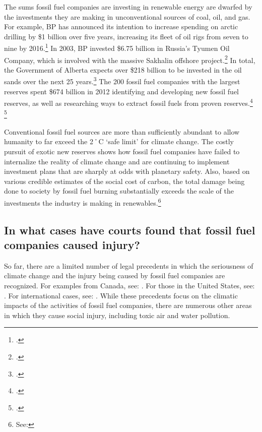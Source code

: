 \documentclass[10pt]{article}
\begin{document}
The sums fossil fuel companies are investing in renewable energy are dwarfed by the investments they are making in unconventional sources of coal, oil, and gas.
For example, BP has announced its intention to increase spending on arctic drilling by \$1 billion over five years, increasing its fleet of oil rigs from seven to nine by 2016.\footcite[][]{BPArcticBillion}
In 2003, BP invested \$6.75 billion in Russia's Tyumen Oil Company, which is involved with the massive Sakhalin offshore project.\footcite[][]{NotBeyondInRussia}
In total, the Government of Alberta expects over \$218 billion to be invested in the oil sands over the next 25 years.\footcite[][]{OilSandsEconBenef}
The 200 fossil fuel companies with the largest reserves spent \$674 billion in 2012 identifying and developing new fossil fuel reserves, as well as researching ways to extract fossil fuels from proven reserves.\footcite[][p. 4]{CTI2012} \footcite[See also: ][]{SteinerFinancialSector}



Conventional fossil fuel sources are more than sufficiently abundant to allow humanity to far exceed the 2˚C `safe limit' for climate change.
The costly pursuit of exotic new reserves shows how fossil fuel companies have failed to internalize the reality of climate change and are continuing to implement investment plans that are sharply at odds with planetary safety.
Also, based on various credible estimates of the social cost of carbon, the total damage being done to society by fossil fuel burning substantially exceeds the scale of the investments the industry is making in renewables.\footnote{See: }

	
	
	\subsection{In what cases have courts found that fossil fuel companies caused injury?}
	\label{LegalPrecedents}
	
	
	
So far, there are a limited number of legal precedents in which the seriousness of climate change and the injury being caused by fossil fuel companies are recognized.
For examples from Canada, see: .
For those in the United States, see: .
For international cases, see: .
While these precedents focus on the climatic impacts of the activities of fossil fuel companies, there are numerous other areas in which they cause social injury, including toxic air and water pollution.
\end{document}

